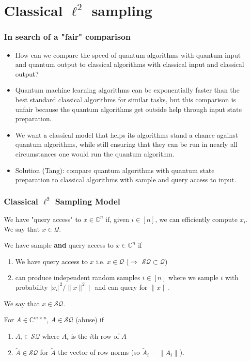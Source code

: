 \documentclass{beamer}
\newcommand\0{\mathbf{0}}
\newcommand\CC{\mathbb{C}}
\newcommand\<{\langle}
\renewcommand\>{\rangle}
\renewcommand\implies{\Rightarrow}
\begin{document}
\section{Classical $\ell^2$ sampling}

\begin{frame}
\frametitle{In search of a "fair" comparison}	

\begin{itemize}
\item How can we compare the speed of quantum algorithms with quantum input and quantum output to classical algorithms with classical input and classical output? 
\item Quantum machine learning algorithms can be exponentially faster than the best standard classical algorithms for similar tasks, but this comparison is unfair because the quantum algorithms get outside help through input state preparation. 
\item We want a classical model that helps its algorithms stand a chance against quantum algorithms, while still ensuring that they can be run in nearly all circumstances one would run the quantum algorithm. 
\item Solution (Tang): compare quantum algorithms with quantum state preparation to classical algorithms with sample and query access to input.	
\end{itemize}
\end{frame}


\begin{frame}
\frametitle{Classical $\ell^2$ Sampling Model}
\begin{definition}
We have "query access" to $x \in \CC^n$ if, given $i \in [n]$, we can efficiently compute $x_i$. We say that $x \in \mathcal{Q}$.
\end{definition}
\begin{definition} We have sample \textbf{and} query access to $x \in \CC^n$ if 

\begin{enumerate}
\item We have query access to $x$ i.e. $x\in \mathcal{Q}$ ($\implies$ $\mathcal{SQ} \subset \mathcal{Q}$)
\item can produce independent random samples $i \in [n]$ where we sample $i$ with probability $|x_i|^2/\|x\|^2∣$ and can query for $\|x\|$.
\end{enumerate}
We say that $x \in \mathcal{SQ}$. 
\end{definition}
\begin{definition} For $A \in \CC^{m\times n}$, $A \in \mathcal{SQ}$ (abuse) if

\begin{enumerate}
\item $A_i \in \mathcal{SQ}$ where $A_i$ is the $i$th row of $A$
\item $\tilde{A} \in \mathcal{SQ}$ for $\tilde{A}$ the vector of row norms (so $\tilde{A}_i = \|A_i\|$).	
\end{enumerate}
 
\end{definition}
\end{frame}
\end{document}
